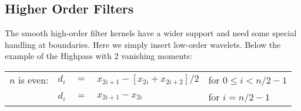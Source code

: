 \subsection{ Higher Order Filters }

The smooth high-order filter kernels have a wider support and need some special
handling at boundaries. Here we simply insert low-order wavelets. Below the
example of the Highpass with 2 vanishing moments:

\begin{center}
\begin{tabular}{lrlll}
\hline
$n$ is even: & $d_{i}$ & $=$ & $x_{2i+1} - [x_{2i} + x_{2i+2}] / 2$ 
                                                       & for $0 \le i < n/2-1$ \\
             & $d_{i}$ & $=$ & $x_{2i+1} - x_{2i}$     & for $i = n/2-1$       \\
\hline
\end{tabular}
\end{center}


